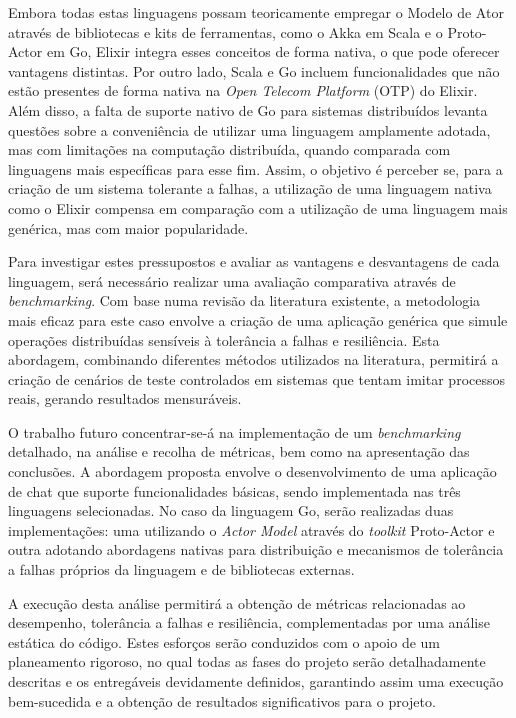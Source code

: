 \begin{abstractotherlanguage}
Embora todas estas linguagens possam teoricamente empregar o Modelo de Ator através de bibliotecas e kits de ferramentas, como o Akka em Scala e o Proto-Actor em Go, Elixir integra esses conceitos de forma nativa, o que pode oferecer vantagens distintas. Por outro lado, Scala e Go incluem funcionalidades que não estão presentes de forma nativa na \textit{Open Telecom Platform} (OTP) do Elixir. Além disso, a falta de suporte nativo de Go para sistemas distribuídos levanta questões sobre a conveniência de utilizar uma linguagem amplamente adotada, mas com limitações na computação distribuída, quando comparada com linguagens mais específicas para esse fim. Assim, o objetivo é perceber se, para a criação de um sistema tolerante a falhas, a utilização de uma linguagem nativa como o Elixir compensa em comparação com a utilização de uma linguagem mais genérica, mas com maior popularidade.

Para investigar estes pressupostos e avaliar as vantagens e desvantagens de cada linguagem, será necessário realizar uma avaliação comparativa através de \textit{benchmarking}. Com base numa revisão da literatura existente, a metodologia mais eficaz para este caso envolve a criação de uma aplicação genérica que simule operações distribuídas sensíveis à tolerância a falhas e resiliência. Esta abordagem, combinando diferentes métodos utilizados na literatura, permitirá a criação de cenários de teste controlados em sistemas que tentam imitar processos reais, gerando resultados mensuráveis.

O trabalho futuro concentrar-se-á na implementação de um \textit{benchmarking} detalhado, na análise e recolha de métricas, bem como na apresentação das conclusões. A abordagem proposta envolve o desenvolvimento de uma aplicação de chat que suporte funcionalidades básicas, sendo implementada nas três linguagens selecionadas. No caso da linguagem Go, serão realizadas duas implementações: uma utilizando o \textit{Actor Model} através do \textit{toolkit} Proto-Actor e outra adotando abordagens nativas para distribuição e mecanismos de tolerância a falhas próprios da linguagem e de bibliotecas externas.

A execução desta análise permitirá a obtenção de métricas relacionadas ao desempenho, tolerância a falhas e resiliência, complementadas por uma análise estática do código. Estes esforços serão conduzidos com o apoio de um planeamento rigoroso, no qual todas as fases do projeto serão detalhadamente descritas e os entregáveis devidamente definidos, garantindo assim uma execução bem-sucedida e a obtenção de resultados significativos para o projeto.

\end{abstractotherlanguage}

